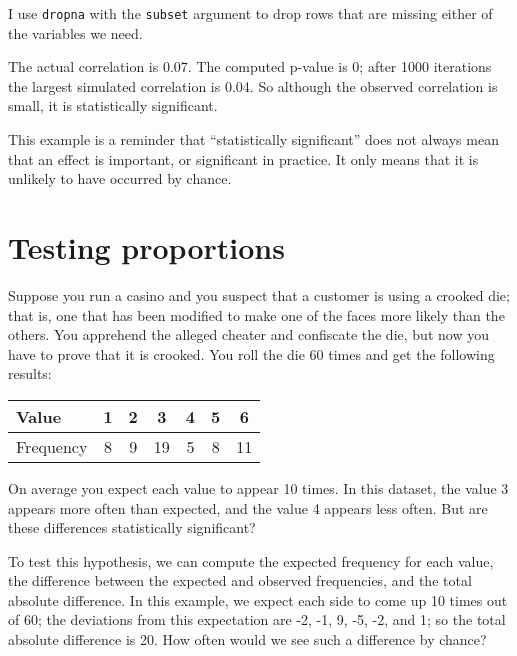 \documentclass[12pt]{book}
\begin{document}
I use {\tt dropna} with the {\tt subset} argument to drop rows
that are missing either of the variables we need.

The actual correlation is 0.07.  The computed p-value is 0; after 1000
iterations the largest simulated correlation is 0.04.  So although the
observed correlation is small, it is statistically significant.
   

This example is a reminder that ``statistically significant'' does not
always mean that an effect is important, or significant in practice.
It only means that it is unlikely to have occurred by chance.


\section{Testing proportions}
\label{casino}

Suppose you run a casino and you suspect that a customer is
using a crooked die; that
is, one that has been modified to make one of the faces more
likely than the others.  You apprehend the alleged
cheater and confiscate the die, but now you have to prove that it
is crooked.  You roll the die 60 times and get the following results:

\begin{center}
\begin{tabular}{|l|c|c|c|c|c|c|}
\hline
Value     &  1  &  2  &  3  &  4  &  5  &  6  \\ 
\hline
Frequency &  8  &  9  &  19  &  5  &  8  &  11  \\
\hline
\end{tabular}
\end{center}

On average you expect each value to appear 10 times.  In this
dataset, the value 3 appears more often than expected, and the value 4
appears less often.  But are these differences statistically
significant?
   

To test this hypothesis, we can compute the expected frequency for
each value, the difference between the expected and observed
frequencies, and the total absolute difference.  In this
example, we expect each side to come up 10 times out of 60; the
deviations from this expectation are -2, -1, 9, -5, -2, and 1; so the
total absolute difference is 20.  How often would we see such a
difference by chance?
\end{document}
